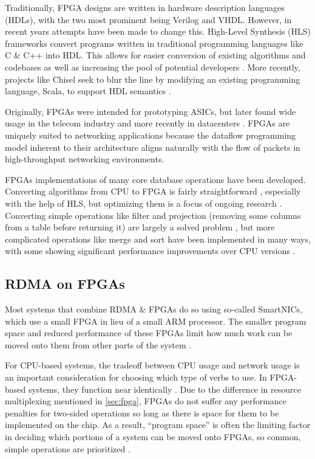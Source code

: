 Traditionally, FPGA designs are written in hardware description languages (HDLs), with the two most prominent being Verilog and VHDL. However, in recent years attempts have been made to change this. High-Level Synthesis (HLS) frameworks convert programs written in traditional programming languages like C \& C++ into HDL. This allows for easier conversion of existing algorithms and codebases as well as increasing the pool of potential developers \autocite{martin-destest-2009}. More recently, projects like Chisel seek to blur the line by modifying an existing programming language, Scala, to support HDL semantics \autocite{chisel}.

Originally, FPGAs were intended for prototyping ASICs, but later found wide usage in the telecom industry \autocite{bobda-trets-2022,mencer-queue-2020} and more recently in datacenters \autocite{mencer-queue-2020,hoozemans-cas-2021}. FPGAs are uniquely suited to networking applications because the dataflow programming model \autocite{hoozemans-cas-2021} inherent to their architecture aligns naturally with the flow of packets in high-throughput networking environments.

FPGAs implementations of many core database operations have been developed. Converting algorithms from CPU to FPGA is fairly straightforward \autocite{fang-vldb-2020}, especially with the help of HLS, but optimizing them is a focus of ongoing research \autocite{fang-vldb-2020}. Converting simple operations like filter and projection (removing some columns from a table before returning it) are largely a solved problem \autocite{fang-vldb-2020}, but more complicated operations like merge and sort have been implemented in many ways, with some showing significant performance improvements over CPU versions \autocite{leggett-trets-2025,moghaddamfar-damon-2021}.


\subsection{RDMA on FPGAs}
\label{sec:rdma-fpga}

Most systems that combine RDMA \& FPGAs do so using so-called SmartNICs, which use a small FPGA in lieu of a small ARM processor. The smaller program space and reduced performance of these FPGAs limit how much work can be moved onto them from other parts of the system \autocite{honeycomb}.

For CPU-based systems, the tradeoff between CPU usage and network usage is an important consideration for choosing which type of verbs to use. In FPGA-based systems, they function near identically \autocite{strom}. Due to the difference in resource multiplexing mentioned in \autoref{sec:fpga}, FPGAs do not suffer any performance penalties for two-sided operations so long as there is space for them to be implemented on the chip. As a result, ``program space'' is often the limiting factor in deciding which portions of a system can be moved onto FPGAs, so common, simple operations are prioritized \autocite{honeycomb,moghaddamfar-damon-2021}.
